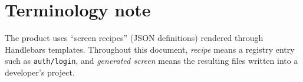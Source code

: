 \section*{Terminology note}

The product uses ``screen recipes'' (JSON definitions) rendered through
Handlebars templates. Throughout this document, \emph{recipe} means a registry
entry such as \texttt{auth/login}, and \emph{generated screen} means the resulting
files written into a developer's project.

\clearpage
